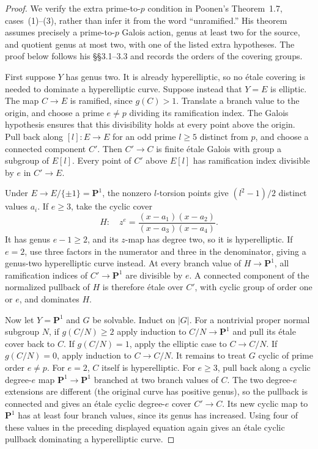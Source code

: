 \begin{proof}
We verify the extra prime-to-$p$ condition in Poonen's
Theorem~1.7, cases~(1)--(3), rather than infer it from the word
``unramified.'' His theorem assumes precisely a prime-to-$p$
Galois action, genus at least two for the source, and quotient
genus at most two, with one of the listed extra hypotheses.
The proof below follows his \S\S3.1--3.3 and records the orders
of the covering groups.\citep[Theorem~1.7 and \S3]{LA_Poonen2005}

First suppose $Y$ has genus two. It is already hyperelliptic,
so no \'etale covering is needed to dominate a hyperelliptic curve.
Suppose instead that $Y=E$ is elliptic. The map $C\to E$ is
ramified, since $g(C)>1$. Translate a branch value to the origin,
and choose a prime $e\ne p$ dividing its ramification index.
The Galois hypothesis ensures that this divisibility holds at
every point above the origin. Pull back along $[l]:E\to E$ for
an odd prime $l\ge5$ distinct from $p$, and choose a connected
component $C'$. Then $C'\to C$ is finite \'etale Galois with
group a subgroup of $E[l]$. Every point of $C'$ above $E[l]$
has ramification index divisible by $e$ in $C'\to E$.

Under $E\to E/\{\pm1\}=\mathbf P^1$, the nonzero $l$-torsion
points give $(l^2-1)/2$ distinct values $a_i$. If $e\ge3$, take
the cyclic cover
\[
 H:\quad z^e=\frac{(x-a_1)(x-a_2)}{(x-a_3)(x-a_4)}.
\]
It has genus $e-1\ge2$, and its $z$-map has degree two, so it
is hyperelliptic. If $e=2$, use three factors in the numerator
and three in the denominator, giving a genus-two hyperelliptic
curve instead. At every branch value of $H\to\mathbf P^1$,
all ramification indices of $C'\to\mathbf P^1$ are divisible
by $e$. A connected component of the normalized pullback of
$H$ is therefore \'etale over $C'$, with cyclic group of order
one or $e$, and dominates $H$.

Now let $Y=\mathbf P^1$ and $G$ be solvable. Induct on $|G|$.
For a nontrivial proper normal subgroup $N$, if $g(C/N)\ge2$
apply induction to $C/N\to\mathbf P^1$ and pull its \'etale
cover back to $C$. If $g(C/N)=1$, apply the elliptic case to
$C\to C/N$. If $g(C/N)=0$, apply induction to $C\to C/N$.
It remains to treat $G$ cyclic of prime order $e\ne p$.
For $e=2$, $C$ itself is hyperelliptic. For $e\ge3$, pull
back along a cyclic degree-$e$ map $\mathbf P^1\to\mathbf P^1$
branched at two branch values of $C$. The two degree-$e$
extensions are different (the original curve has positive genus),
so the pullback is connected and gives an \'etale cyclic
degree-$e$ cover $C'\to C$. Its new cyclic map to $\mathbf P^1$
has at least four branch values, since its genus has increased.
Using four of these values in the preceding displayed equation
again gives an \'etale cyclic pullback dominating a hyperelliptic
curve.


\end{proof}
